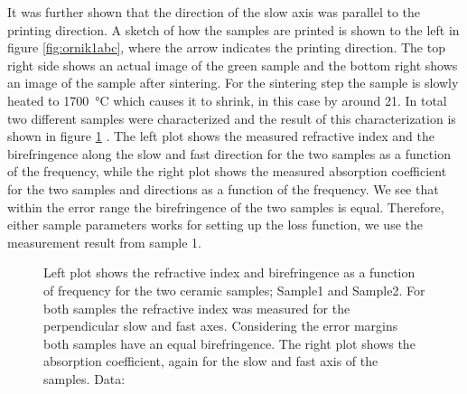 It was further shown that the direction of the slow axis was parallel to the printing direction. A sketch of how the samples are printed is shown to the left in figure \ref{fig:ornik1abc}, where the arrow indicates the printing direction. The top right side shows an actual image of the green sample and the bottom right shows an image of the sample after sintering. For the sintering step the sample is slowly heated to \SI{1700}{\celsius} which causes it to shrink, in this case by around \SI{21}{\volpercent}. In total two different samples were characterized and the result of this characterization is shown in figure \ref{fig:ri_abs} \cite{Ornik2021}. The left plot shows the measured refractive index and the birefringence along the slow and fast direction for the two samples as a function of the frequency, while the right plot shows the measured absorption coefficient for the two samples and directions as a function of the frequency. We see that within the error range the birefringence of the two samples is equal. Therefore, either sample parameters works for setting up the loss function, we use the measurement result from sample 1. 

\begin{figure}[h]
    \centering
    
    \caption{Left plot shows the refractive index and birefringence as a function of frequency for the two ceramic  samples; Sample1 and Sample2. For both samples the refractive index was measured for the perpendicular slow and fast axes. Considering the error margins both samples have an equal birefringence. The right plot shows the absorption coefficient, again for the slow and fast axis of the samples. Data: \cite{Ornik2021}}
    \label{fig:ri_abs}
\end{figure}

